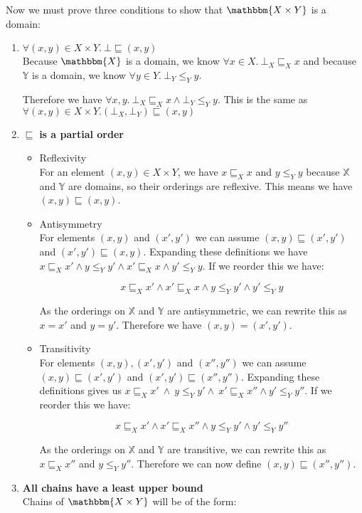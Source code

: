Now we must prove three conditions to show that $\mathbbm{X \times Y}$ is a domain:

\begin{enumerate}
\item{$\forall (x,y) \in X \times Y. \ \bot  \sqsubseteq (x,y)$\\
Because $\mathbbm{X}$ is a domain, we know $\forall x \in X. \ \bot_X \sqsubseteq_X x$ and because $\mathbb{Y}$ is a domain, we know $\forall y \in Y. \ \bot_Y \leq_Y y$.

Therefore we have $\forall x,y . \ \bot_X \sqsubseteq_X x \wedge \bot_Y \leq_Y y$. This is the same as $\forall (x,y) \in X \times Y. (\bot_X,\bot_Y) \sqsubseteq (x,y)$}
\item{$\sqsubseteq $ \textbf{is a partial order}\\
\begin{itemize}
\item{Reflexivity\\
For an element $(x,y) \in X \times Y$, we have $x \sqsubseteq_X x$ and $y \leq_Y y$ because $\mathbb{X}$ and $\mathbb{Y}$ are domains, so their orderings are reflexive. This means we have $(x,y) \sqsubseteq (x,y)$.}
\item{Antisymmetry\\
For elements $(x,y)$ and $(x',y')$ we can assume $(x,y) \sqsubseteq (x',y')$ and $(x',y') \sqsubseteq (x,y)$. Expanding these definitions we have $x \sqsubseteq_X x' \wedge y \leq_Y y' \wedge x' \sqsubseteq_X x \wedge y' \leq_Y y$. If we reorder this we have:

\[x \sqsubseteq_X x' \wedge x' \sqsubseteq_X x \wedge y \leq_Y y' \wedge y' \leq_Y y \]

As the orderings on $\mathbb{X}$ and $\mathbb{Y}$ are antisymmetric, we can rewrite this as $x = x'$ and $y = y'$. Therefore we have $(x,y) = (x',y')$.}
\item{Transitivity\\
 For elements $(x,y), (x',y')$ and $(x'',y'')$ we can assume $(x,y) \sqsubseteq (x',y')$ and $(x',y') \sqsubseteq (x'',y'')$. Expanding these definitions gives us $x \sqsubseteq_X x' \ \wedge \ y \leq_Y y' \wedge \ x' \sqsubseteq_X x'' \wedge y' \leq_Y y''$. If we reorder this we have:


\[x \sqsubseteq_X x' \wedge x' \sqsubseteq_X x'' \wedge y \leq_Y y' \wedge y' \leq_Y y'' \]

As the orderings on $\mathbb{X}$ and $\mathbb{Y}$ are transitive, we can rewrite this as $x \sqsubseteq_X x''$ and $y \leq_Y y''$. Therefore we can now define $(x,y) \sqsubseteq (x'',y'')$.}
\end{itemize}}
\item{\textbf{All chains have a least upper bound}\\
Chains of $\mathbbm{X \times Y}$ will be of the form:

}
\end{enumerate}
